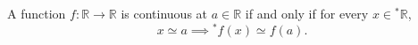 A function $f : \mathbb{R} \to \mathbb{R}$ is continuous at $a \in \mathbb{R}$ if and only if for every $x \in {}^*\mathbb{R}$,
$$x \simeq a \implies {}^*f(x) \simeq f(a).$$
